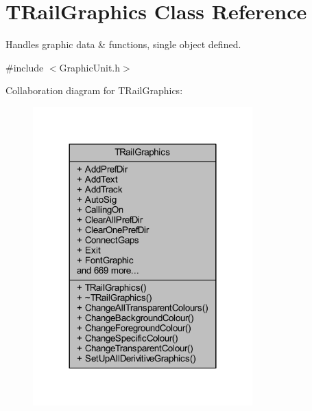 \hypertarget{class_t_rail_graphics}{}\section{T\+Rail\+Graphics Class Reference}
\label{class_t_rail_graphics}


Handles graphic data \& functions, single object defined.  




{\ttfamily \#include $<$Graphic\+Unit.\+h$>$}



Collaboration diagram for T\+Rail\+Graphics\+:\nopagebreak
\begin{figure}[H]
\begin{center}
\leavevmode
\includegraphics[width=240pt]{class_t_rail_graphics__coll__graph}
\end{center}
\end{figure}
